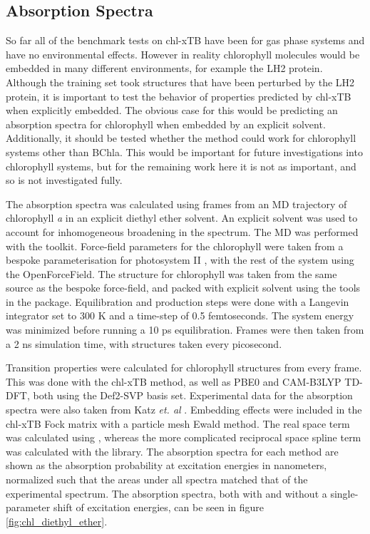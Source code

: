 \afterpartskip
\subsection{Absorption Spectra}
\label{subsec:absorption_spectra}

So far all of the benchmark tests on chl-xTB have been for gas phase systems and
have no environmental effects. However in reality chlorophyll molecules would be
embedded in many different environments, for example the LH2 protein. Although the
training set took structures that have been perturbed by the LH2 protein, it is 
important to test the behavior of properties predicted by chl-xTB when explicitly
embedded. The obvious case for this would be predicting an absorption spectra for
chlorophyll when embedded by an explicit solvent. Additionally, it should be tested
whether the method could work for chlorophyll systems other than BChla. This would
be important for future investigations into chlorophyll systems, but for the remaining
work here it is not as important, and so is not investigated fully.

The absorption spectra was calculated using frames from an MD trajectory of chlorophyll
\emph{a} in an explicit diethyl ether solvent. An explicit solvent was used to account
for inhomogeneous broadening in the spectrum. The MD was performed with the
 toolkit. Force-field parameters for the chlorophyll were taken from
a bespoke parameterisation for photosystem II \cite{Zhang2012}, with the rest of
the system using the OpenForceField. The structure for chlorophyll was taken from
the same source as the bespoke force-field, and packed with explicit solvent using
the tools in the  package. Equilibration and production steps were 
done with a Langevin integrator set to 300 K  and a time-step of 0.5 femtoseconds.
The system energy was minimized before running a 10 ps equilibration. Frames were
then taken from a 2 ns simulation time, with structures taken every picosecond.

Transition properties were calculated for chlorophyll structures from every frame.
This was done with the chl-xTB method, as well as PBE0 and CAM-B3LYP TD-DFT, both
using the Def2-SVP basis set. Experimental data for the absorption spectra were 
also taken from Katz \emph{et. al} \cite{Strain1963}. Embedding effects were
included in the chl-xTB Fock matrix with a particle mesh Ewald method. The real 
space term was calculated using , whereas the more complicated reciprocal
space spline term was calculated with the  library. The absorption 
spectra for each method are shown as the absorption probability at excitation energies
in nanometers, normalized such that the areas under all spectra matched that of 
the experimental spectrum. The absorption spectra, both with and without a single-parameter
shift of excitation energies, can be seen in figure \ref{fig:chl_diethyl_ether}.

